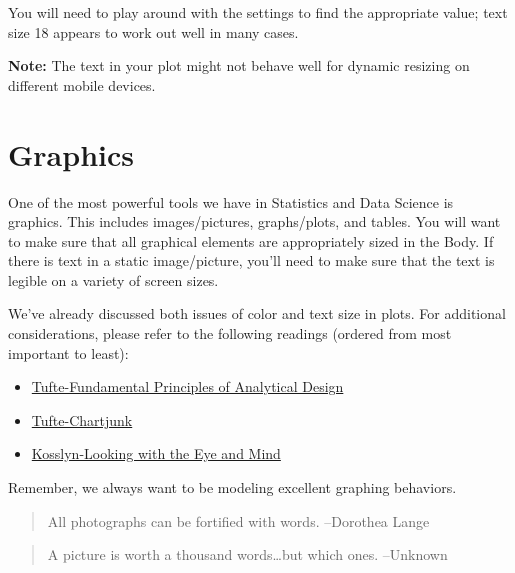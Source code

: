 \documentclass[]{book}
\providecommand{\tightlist}{%
  \setlength{\itemsep}{0pt}\setlength{\parskip}{0pt}}
\begin{document}
You will need to play around with the settings to find the appropriate value; text size 18 appears to work out well in many cases.

\textbf{Note:} The text in your plot might not behave well for dynamic resizing on different mobile devices.

\hypertarget{graphics}{%
\section{Graphics}\label{graphics}}

One of the most powerful tools we have in Statistics and Data Science is graphics. This includes images/pictures, graphs/plots, and tables. You will want to make sure that all graphical elements are appropriately sized in the Body. If there is text in a static image/picture, you'll need to make sure that the text is legible on a variety of screen sizes.

We've already discussed both issues of color and text size in plots. For additional considerations, please refer to the following readings (ordered from most important to least):

\begin{itemize}
\tightlist
\item
  \href{https://www.dropbox.com/s/hb52991v09p8q91/Tufte\%20-\%202006\%20-\%20The\%20Fundamental\%20principles\%20of\%20analytical\%20design.pdf?dl=0}{Tufte-Fundamental Principles of Analytical Design}
\item
  \href{https://www.dropbox.com/s/z8yrf4eqph6c2h4/Tufte\%20-\%202001\%20-\%20Chartjunk\%20Vibrations\%2C\%20grids\%2C\%20and\%20ducks.pdf?dl=0}{Tufte-Chartjunk}\\
\item
  \href{https://www.dropbox.com/s/62uegsribwdjtze/Kosslyn\%20-\%202006\%20-\%20Looking\%20with\%20the\%20eye\%20and\%20mind.pdf?dl=0}{Kosslyn-Looking with the Eye and Mind}
\end{itemize}

Remember, we always want to be modeling excellent graphing behaviors.

\begin{quote}
All photographs can be fortified with words. --Dorothea Lange
\end{quote}

\begin{quote}
A picture is worth a thousand words\ldots{}but which ones. --Unknown
\end{quote}
\end{document}
